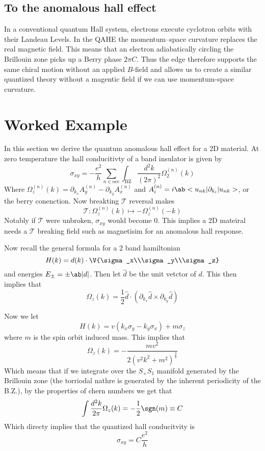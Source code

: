 \documentclass[aps,prb,twocolumn]{revtex4-2}
\begin{document}
    \subsection{To the anomalous hall effect}
      In a conventional quantum Hall system, electrons execute cyclotron orbits with their Landeau Levels. In the QAHE the momentum--space curvature replaces the real magnetic field. This means that an electron adiabatically circling the Brillouin zone picks up a Berry phase $2\pi C$. Thus the edge therefore supports the same chiral motion without an applied $B$-field and allows us to create a similar quantized theory without a magentic field if we can use momentum-space curvature.


  \section{Worked Example}
    In this section we derive the quantum anomalous hall effect for a 2D material. At zero temperature the hall conducitivty of a band insulator is given by 
    \[\sigma_{xy}=-\frac{e^2}h\sum_{n\in\mathrm{occ}}\int_{\mathrm{BZ}}\frac{d^2k}{(2\pi)^2}\Omega_2^{(n)}(k)\]
    Where $\Omega_z^{(n)}(k)=\partial_{k_x}A_y^{(n)}-\partial_{k_y}A_x^{(n)}$ and $A_i^{(n)}=i\ab<u_{nk}|\partial_{k_i}|u_{nk}>$, or the berry conenction.
    Now breakting $\mathcal{T}$ reversal makes 
    \[\mathcal{T}:\Omega_z^{(n)}(k)\mapsto-\Omega_z^{(n)}(-k)\]
    Notably if $\mathcal{T}$ were unbroken, $\sigma_{xy}$ would become 0. This implies a 2D mateiral needs a $\mathcal{T}$ breaking field such as magnetisim for an anomalous hall response.
    
    Now recall the general formula for a 2 band hamiltonian
    \begin{equation}
      H(k)=d(k)\cdot\V{\sigma_x\\\sigma_y\\\sigma_z}
    \end{equation}
    and energies $E_\pm=\pm\ab|d|$. Then let $\hat{d}$ be the unit vetctor of $d$. This then implies that 
    \[\Omega_z(k)=\frac12 \hat{d}\cdot (\partial_{k_x}\hat{d}\times\partial_{k_y}\hat{d})\]

    Now we let
    \[H(k)=v(k_x\sigma_y-k_y\sigma_x)+m\sigma_z\]
    where $m$ is the spin orbit induced mass. This implies that
    \[\Omega_z(k)=-\frac{mv^2}{2(v^2k^2+m^2)^{\frac32}}\]
    Which means that if we integrate over the $S_\times S_1$ manifold generated by the Brillouin zone (the torriodal nathre is generated by the inherent periodicity of the B.Z.), by the properties of chern numbers we get that
    \[\int \frac{d^2k}{2\pi}\Omega_z(k)=-\frac12\sgn(m)\equiv C\]
    Which directy implies that the quantized hall conducitvity is 
    \[\sigma_{xy}=C\frac{e^2}{h}\]
\end{document}

